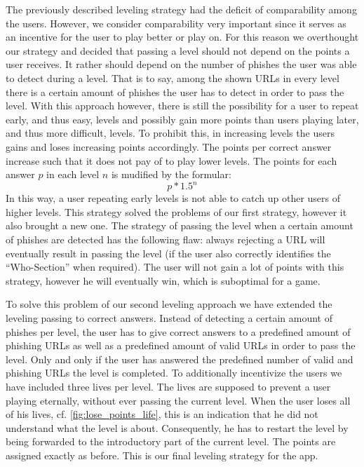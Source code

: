 \begin{description}[leftmargin=0cm]
	\item[Leveling Based on Detected Phishes] The previously described leveling strategy had the deficit of comparability among the users.
 However, we consider comparability very important  since it serves as an incentive for the user to play better or play on.
 For this reason we overthought our strategy and decided that passing a level should not depend on the points a user receives.
 It rather should depend on the number of phishes the user was able to detect during a level.
 That is to say, among the shown URLs in every level there is a certain amount of phishes the user has to detect in order to pass the level.
 With this approach however, there is still the possibility for a user to repeat early, and thus easy, levels and possibly gain more points than users playing later, and thus more difficult, levels.
 To prohibit this, in increasing levels the users gains and loses increasing points accordingly.
 The points per correct answer increase such that it does not pay of to play lower levels. The points for each answer $p$ in each level $n$ is mudified by the formular:
 $$p*1.5^n$$
 In this way, a user repeating early levels is not able to catch up other users of higher levels.
 This strategy solved the problems of our first strategy, however it also brought a new one.
 The strategy of passing the level when a certain amount of phishes are detected has the following flaw: always rejecting a URL will eventually result in passing the level (if the user also correctly identifies the ``Who-Section'' when required). The user will not gain a lot of points with this strategy, however he will eventually win, which is suboptimal for a game.
  
	\item[Leveling Based on Correct Answers] To solve this problem of our second leveling approach we have extended the leveling passing to correct answers.
 Instead of detecting a certain amount of phishes per level, the user has to give correct answers to a predefined amount of phishing URLs as well as a predefined amount of valid URLs in order to pass the level.
 Only and only if the user has answered the predefined number of valid and phishing URLs the level is completed.
 To additionally incentivize the users we have included three lives per level.
 The lives are supposed to prevent a user playing eternally, without ever passing the current level.
 When the user loses all of his lives, cf. \autoref{fig:lose_points_life}, this is an indication that he did not understand what the level is about.
 Consequently, he has to restart the level by being forwarded to the introductory part of the current level.
 The points are assigned exactly as before.
 This is our final leveling strategy for the app.
\end{description}

